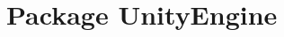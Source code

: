 \hypertarget{namespace_unity_engine}{}\section{Package Unity\+Engine}
\label{namespace_unity_engine}
